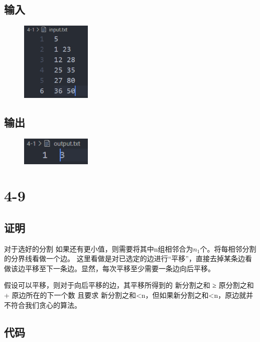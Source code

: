 \documentclass[11pt]{article}  %
\begin{document}
\subsection*{输入}

    \begin{figure}[H]
        \centering
        \includegraphics[width = 0.3\textwidth]{pic/4-1in.png}
    \end{figure}

\subsection*{输出}

    \begin{figure}[H]
        \centering
        \includegraphics[width = 0.3\textwidth]{pic/4-1out.png}
    \end{figure}

\section*{4-9}

\subsection*{证明}

对于选好的分割
如果还有更小值，则需要将其中n组相邻合为$n_1$个。将每相邻分割的分界线看做一个边。
这里看做是对已选定的边进行“平移”，直接去掉某条边看做该边平移至下一条边。显然，每次平移至少需要一条边向后平移。

假设可以平移，则对于向后平移的边，其平移所得到的 新分割之和 ≥ 原分割之和 + 原边所在的下一个数
且要求 新分割之和<n，但如果新分割之和<n，原边就并不符合我们贪心的算法。


\subsection*{代码}
\end{document}

